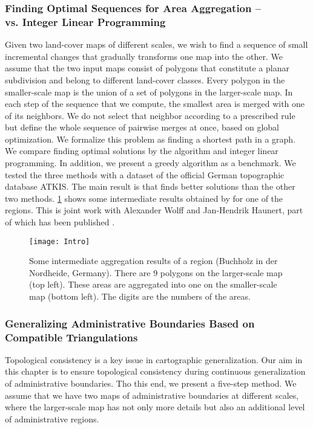 \subsubsection{Finding Optimal Sequences for Area Aggregation -- 
\protect \\ \Astar vs. Integer Linear Programming}

Given two land-cover maps of different scales, 
we wish to find a sequence of small incremental
changes that gradually transforms one map into the other.
We assume that the two input maps consist of
polygons that constitute a planar subdivision and belong to
different land-cover classes. 
Every polygon in the smaller-scale map
is the union of a set of polygons in the larger-scale map. 
In each step of the sequence that we compute, 
the smallest area is merged with one of its neighbors. 
We do not select that neighbor according to a prescribed rule 
but define the whole sequence of pairwise merges at once, 
based on global optimization.
We formalize this problem as 
finding a shortest path in a graph.
We compare finding optimal solutions by the \Astar algorithm 
and integer linear programming.
In addition, we present a greedy algorithm 
as a benchmark.
We tested the three methods with a
dataset of the official German topographic database ATKIS.
The main result is that 
\Astar finds better solutions than the other two methods.
\fig\ref{fig:Intro_AreaAgg_Case612} shows some intermediate 
results obtained by \Astar for one of the regions.
This is joint work with Alexander Wolff and Jan-Hendrik Haunert,
part of which has been published \cite{Peng2017AStar}.


\begin{figure}[tb]
	\centering
	\texttt{[image: Intro]}
	\caption{Some intermediate aggregation results of 
		a region (Buchholz in der Nordheide, Germany). 
		There are $9$ polygons on 
		the larger-scale map (top left). 
		These areas are aggregated into one 
		on the smaller-scale map (bottom left). 
		The digits are the numbers of the areas.
}
	\label{fig:Intro_AreaAgg_Case612}
\end{figure}

\subsubsection{Generalizing Administrative Boundaries
	Based on Compatible Triangulations}

Topological consistency is a key issue 
in cartographic generalization.
Our aim in this chapter is to ensure topological consistency  
during continuous generalization of administrative boundaries.
Tho this end, we present a five-step method.
We assume that we have two maps of administrative
boundaries at different scales, where the larger-scale map has 
not
only more details but also an additional level of administrative
regions.

